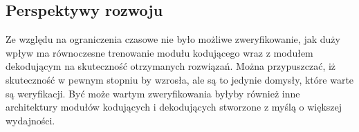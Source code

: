 \subsection{Perspektywy rozwoju}
Ze względu na ograniczenia czasowe nie było możliwe zweryfikowanie, jak duży wpływ ma równoczesne trenowanie modułu kodującego wraz z modułem dekodującym na skuteczność otrzymanych rozwiązań. Można przypuszczać, iż skuteczność w pewnym stopniu by wzrosła, ale są to jedynie domysły, które warte są weryfikacji. Być może wartym zweryfikowania byłyby również inne architektury modułów kodujących i dekodujących stworzone z myślą o większej wydajności.
